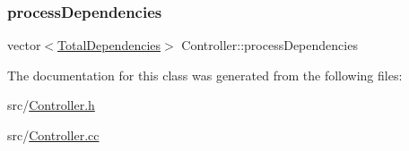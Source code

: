\mbox{\label{class_controller_ae8234cd96adbdeff4b56a59f6c54df58}} 
\subsubsection{\texorpdfstring{process\+Dependencies}{processDependencies}}
{\footnotesize\ttfamily vector$<$\hyperlink{class_total_dependencies}{Total\+Dependencies}$>$ Controller\+::process\+Dependencies\hspace{0.3cm}{\ttfamily [private]}}



The documentation for this class was generated from the following files\+:\begin{DoxyCompactItemize}
\item 
src/\hyperlink{_controller_8h}{Controller.\+h}\item 
src/\hyperlink{_controller_8cc}{Controller.\+cc}\end{DoxyCompactItemize}
